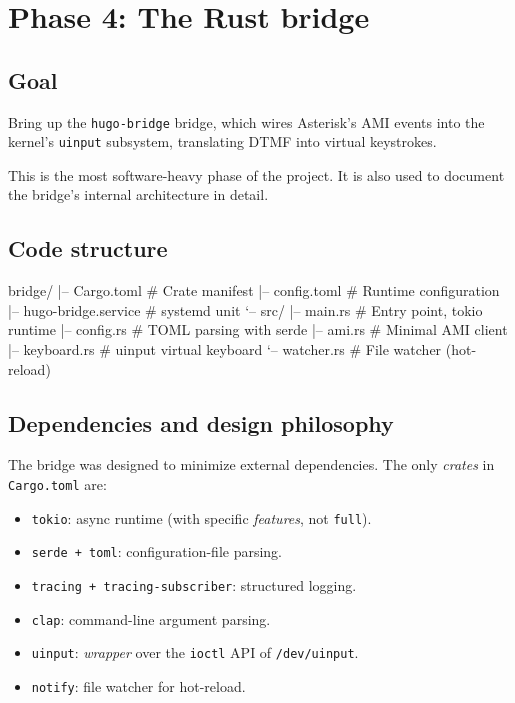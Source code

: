 \chapter{Phase 4: The Rust bridge}

\section{Goal}

Bring up the \texttt{hugo-bridge} bridge, which wires Asterisk's AMI events into the kernel's \texttt{uinput} subsystem, translating DTMF into virtual keystrokes.

This is the most software-heavy phase of the project. It is also used to document the bridge's internal architecture in detail.

\section{Code structure}

\begin{plaincode}
bridge/
|-- Cargo.toml                 # Crate manifest
|-- config.toml                # Runtime configuration
|-- hugo-bridge.service        # systemd unit
`-- src/
    |-- main.rs                # Entry point, tokio runtime
    |-- config.rs              # TOML parsing with serde
    |-- ami.rs                 # Minimal AMI client
    |-- keyboard.rs            # uinput virtual keyboard
    `-- watcher.rs             # File watcher (hot-reload)
\end{plaincode}

\section{Dependencies and design philosophy}

The bridge was designed to minimize external dependencies. The only \emph{crates} in \texttt{Cargo.toml} are:

\begin{itemize}
  \item \texttt{tokio}: async runtime (with specific \emph{features}, not \texttt{full}).
  \item \texttt{serde + toml}: configuration-file parsing.
  \item \texttt{tracing + tracing-subscriber}: structured logging.
  \item \texttt{clap}: command-line argument parsing.
  \item \texttt{uinput}: \emph{wrapper} over the \texttt{ioctl} API of \texttt{/dev/uinput}.
  \item \texttt{notify}: file watcher for hot-reload.
\end{itemize}

